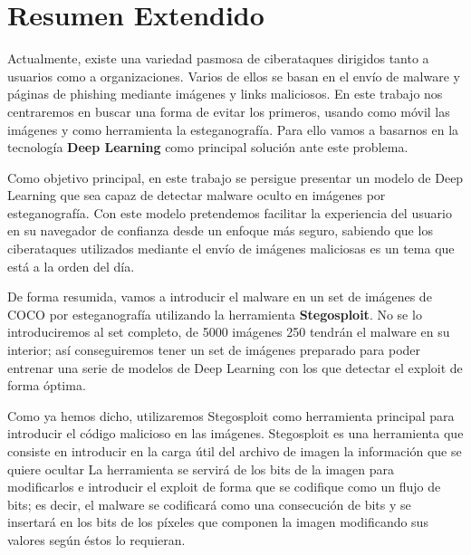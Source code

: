 \chapter{Resumen Extendido}

Actualmente, existe una variedad pasmosa de ciberataques dirigidos tanto a usuarios como a organizaciones. Varios de ellos se basan en el envío de malware y páginas de phishing mediante imágenes y links maliciosos. En este trabajo nos centraremos en buscar una forma de evitar los primeros, usando como móvil las imágenes y como herramienta la esteganografía. Para ello vamos a basarnos en la tecnología \textbf{Deep Learning} como principal solución ante este problema.

Como objetivo principal, en este trabajo se persigue presentar un modelo de Deep Learning que sea capaz de detectar malware oculto en imágenes por esteganografía. Con este modelo pretendemos facilitar la experiencia del usuario en su navegador de confianza desde un enfoque más seguro, sabiendo que los ciberataques utilizados mediante el envío de imágenes maliciosas es un tema que está a la orden del día.

De forma resumida, vamos a introducir el malware en un set de imágenes de COCO por esteganografía utilizando la herramienta \textbf{Stegosploit}. No se lo introduciremos al set completo, de 5000 imágenes 250 tendrán el malware en su interior; así conseguiremos tener un set de imágenes preparado para poder entrenar una serie de modelos de Deep Learning con los que detectar el exploit de forma óptima. %

Como ya hemos dicho, utilizaremos Stegosploit como herramienta principal para introducir el código malicioso en las imágenes. Stegosploit es una herramienta que consiste en introducir en la carga útil del archivo de imagen la información que se quiere ocultar La herramienta se servirá de los bits de la imagen para modificarlos e introducir el exploit de forma que se codifique como un flujo de bits; es decir, el malware se codificará como una consecución de bits y se insertará en los bits de los píxeles que componen la imagen modificando sus valores según éstos lo requieran.

